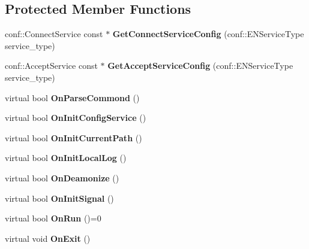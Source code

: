 \subsection*{Protected Member Functions}
\begin{DoxyCompactItemize}
\item 
\hypertarget{classBasicServer_a57bfbb727ac20f12df5b92dfd21cede7}{
conf::ConnectService const $\ast$ {\bfseries GetConnectServiceConfig} (conf::ENServiceType service\_\-type)}
\label{classBasicServer_a57bfbb727ac20f12df5b92dfd21cede7}

\item 
\hypertarget{classBasicServer_a08bb27e1958d5272549728936a267fcc}{
conf::AcceptService const $\ast$ {\bfseries GetAcceptServiceConfig} (conf::ENServiceType service\_\-type)}
\label{classBasicServer_a08bb27e1958d5272549728936a267fcc}

\item 
\hypertarget{classBasicServer_ae9818f0309222dad749a9f643ff78525}{
virtual bool {\bfseries OnParseCommond} ()}
\label{classBasicServer_ae9818f0309222dad749a9f643ff78525}

\item 
\hypertarget{classBasicServer_a911f7e8d02377f8dfb744ad4042a16de}{
virtual bool {\bfseries OnInitConfigService} ()}
\label{classBasicServer_a911f7e8d02377f8dfb744ad4042a16de}

\item 
\hypertarget{classBasicServer_ac894c7c46cafa3be96cae0d2e2260c91}{
virtual bool {\bfseries OnInitCurrentPath} ()}
\label{classBasicServer_ac894c7c46cafa3be96cae0d2e2260c91}

\item 
\hypertarget{classBasicServer_a42dc8b2e2c0325a3861918e1d2f5582f}{
virtual bool {\bfseries OnInitLocalLog} ()}
\label{classBasicServer_a42dc8b2e2c0325a3861918e1d2f5582f}

\item 
\hypertarget{classBasicServer_a6eb15706ba1d16ef6a1da02c0b22eccb}{
virtual bool {\bfseries OnDeamonize} ()}
\label{classBasicServer_a6eb15706ba1d16ef6a1da02c0b22eccb}

\item 
\hypertarget{classBasicServer_a61414cb03ed466350da25a2ab73bfccf}{
virtual bool {\bfseries OnInitSignal} ()}
\label{classBasicServer_a61414cb03ed466350da25a2ab73bfccf}

\item 
\hypertarget{classBasicServer_a85cc09a4f0cb119f62898d5c238b7e82}{
virtual bool {\bfseries OnRun} ()=0}
\label{classBasicServer_a85cc09a4f0cb119f62898d5c238b7e82}

\item 
\hypertarget{classBasicServer_a0714a5d0a9d0556433b0536430e4b5a2}{
virtual void {\bfseries OnExit} ()}
\label{classBasicServer_a0714a5d0a9d0556433b0536430e4b5a2}

\end{DoxyCompactItemize}
